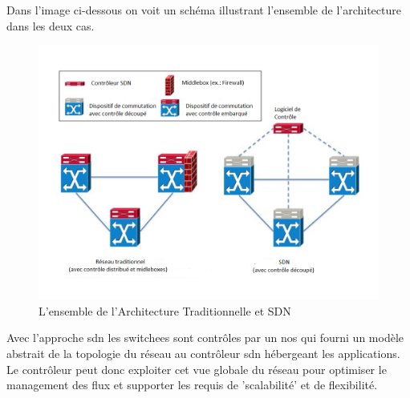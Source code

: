 Dans l'image ci-dessous on voit un schéma illustrant l'ensemble de l'architecture dans les deux cas.




\begin{figure}[!h] %
\includegraphics[width=15cm]{images/TraditionalVsSDN.png} %
\caption{ L'ensemble de l'Architecture Traditionnelle et SDN \cite{SurveySDNArchi}} %
\label{imgOverviewArchi} %
\end{figure} %

Avec l'approche \gls{sdn} les switchees sont contrôles par un \gls{nos} qui fourni un modèle abstrait de la topologie du réseau au contrôleur \gls{sdn} hébergeant les applications. Le contrôleur peut donc exploiter cet vue globale du réseau pour optimiser le management des flux et supporter les requis de 'scalabilité' et de flexibilité.


